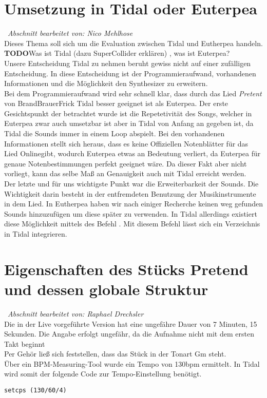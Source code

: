 \documentclass[
10pt, %
a4paper, %
oneside, %
headinclude,footinclude, %
BCOR5mm, %
]{scrartcl}
\begin{document}
\section{Umsetzung in Tidal oder Euterpea}\
\textit{Abschnitt bearbeitet von: Nico Mehlhose}\\

\noindent Dieses Thema soll sich um die Evaluation zwischen Tidal und Eutherpea handeln.\\
{\color{red}\textbf{TODO}}Was ist Tidal\cite{Tidal} (dazu SuperCollider\cite{SC} erklären) , was ist Euterpea\cite{Euterpea}?\\
Unsere Entscheidung Tidal zu nehmen beruht gewiss nicht auf einer zufälligen Entscheidung. In diese Entscheidung ist der Programmieraufwand, vorhandenen Informationen
und die Möglichkeit den Synthesizer zu erweitern.\\
Bei dem Programmieraufwand wird sehr schnell klar, dass durch das Lied \textit{Pretent} von BrandBrauerFrick Tidal besser geeignet ist als Euterpea. Der erste Gesichtspunkt
der betrachtet wurde ist die Repetetivität des Songs, welcher in Euterpea zwar auch umsetzbar ist aber in Tidal von Anfang an gegeben ist, da Tidal die Sounds immer in einem
Loop abspielt. Bei den vorhandenen Informationen stellt sich heraus, dass es keine Offiziellen Notenblätter für das Lied Onlinegibt, wodurch Euterpea etwas an Bedeutung verliert, da Euterpea für genaue Notenbestimmungen perfekt geeignet wäre. Da dieser Fakt aber nicht vorliegt, kann das selbe Maß an Genauigkeit auch mit Tidal erreicht werden.\\
Der letzte und für uns wichtigste Punkt war die Erweiterbarkeit der Sounds. Die Wichtigkeit darin besteht in der entfremdeten Benutzung der Musikinstrumente in dem Lied.
In Eutherpea haben wir nach einiger Recherche keinen weg gefunden Sounds hinzuzufügen um diese später zu verwenden. In Tidal allerdings existiert diese Möglichkeit mittels
des Befehl \textit{}. Mit diesem Befehl lässt sich ein Verzeichnis in Tidal integrieren.
\section{Eigenschaften des Stücks Pretend und dessen globale Struktur}\
\textit{Abschnitt bearbeitet von: Raphael Drechsler}\\

\noindent Die in der Live vorgeführte Version \cite{YT1} hat eine ungefähre Dauer von 7 Minuten, 15 Sekunden. Die Angabe erfolgt ungefähr, da die Aufnahme nicht mit dem ersten Takt beginnt\\
Per Gehör ließ sich feststellen, dass das Stück in der Tonart Gm steht.\\
Über ein BPM-Measuring-Tool \cite{tempo} wurde ein Tempo von 130bpm ermittelt. In Tidal wird somit der folgende Code zur Tempo-Einstellung benötigt. 
\begin{lstlisting}
setcps (130/60/4)
\end{lstlisting}
\end{document}
